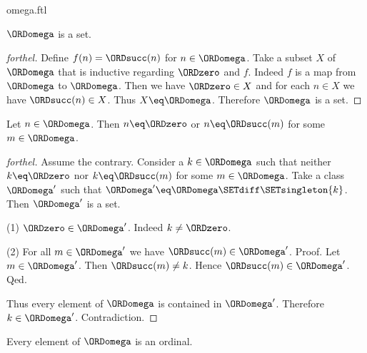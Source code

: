 \documentclass{naproche-library}
\begin{document}
\begin{smodule}[title=The Ordinal $\omega$]{omega.ftl}
\begin{corollary}[forthel,id=SET_THEORY_03_4847727433220096]
  $\ORDomega$ is a set.
\end{corollary}
\begin{proof}[forthel]
  Define $f(n) = \ORDsucc(n)$ for $n \in \ORDomega$.
  Take a subset $X$ of $\ORDomega$ that is inductive regarding $\ORDzero$ and $f$.
  Indeed $f$ is a map from $\ORDomega$ to $\ORDomega$.
  Then we have $\ORDzero \in X$ and for each $n \in X$ we have $\ORDsucc(n) \in X$.
  Thus $X \eq \ORDomega$.
  Therefore $\ORDomega$ is a set.
\end{proof}

\begin{proposition}[forthel,id=SET_THEORY_03_5885789275684864]
  Let $n \in \ORDomega$.
  Then $n \eq \ORDzero$ or $n \eq \ORDsucc(m)$ for some $m \in \ORDomega$.
\end{proposition}
\begin{proof}[forthel]
  Assume the contrary.
  Consider a $k \in \ORDomega$ such that neither $k \eq \ORDzero$ nor $k \eq \ORDsucc(m)$ for
  some $m \in \ORDomega$.
  Take a class $\ORDomega'$ such that $\ORDomega' \eq \ORDomega \SETdiff \SETsingleton{k}$. %
  Then $\ORDomega'$ is a set.

  (1) $\ORDzero \in \ORDomega'$.
  Indeed $k \neq \ORDzero$.

  (2) For all $m \in \ORDomega'$ we have $\ORDsucc(m) \in \ORDomega'$. \newline
  Proof.
    Let $m \in \ORDomega'$.
    Then $\ORDsucc(m) \neq k$.
    Hence $\ORDsucc(m) \in \ORDomega'$.
  Qed.

  Thus every element of $\ORDomega$ is contained in $\ORDomega'$.
  Therefore $k \in \ORDomega'$.
  Contradiction.
\end{proof}

\begin{proposition}[forthel,id=SET_THEORY_03_5057540872208384]
  Every element of $\ORDomega$ is an ordinal.
\end{proposition}
\end{smodule}
\end{document}

